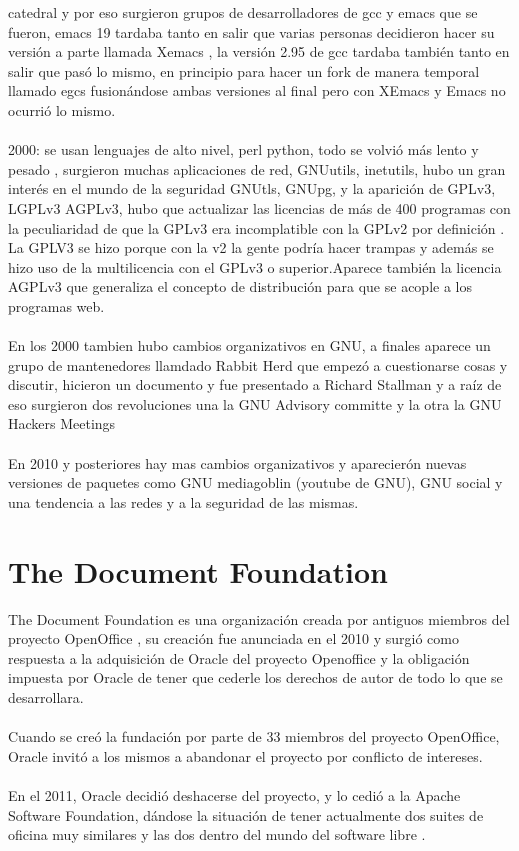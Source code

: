 \documentclass[a4paper,oneside,11pt]{article}
\begin{document}
 catedral y por eso surgieron grupos de desarrolladores de gcc y emacs que se fueron, emacs 19
  tardaba tanto en salir que varias personas decidieron hacer su versi\'on a parte llamada Xemacs , la versi\'on 2.95 de gcc 
  tardaba tambi\'en tanto en salir que pas\'o lo mismo, en principio para hacer un fork de manera temporal llamado egcs fusion\'andose
  ambas versiones al final pero con XEmacs y Emacs no ocurri\'o lo mismo.
\\\\
2000: se usan lenguajes de alto nivel, perl python, todo se volvi\'o m\'as lento y pesado , surgieron
 muchas aplicaciones de red, GNUutils, inetutils, hubo un gran inter\'es en el mundo de la seguridad
  GNUtls, GNUpg, y la aparici\'on de GPLv3, LGPLv3 AGPLv3,  hubo que actualizar las licencias de m\'as
   de 400 programas con la peculiaridad de que la GPLv3 era incomplatible con la GPLv2 por definici\'on .
    La GPLV3 se hizo porque con la v2 la gente podr\'ia hacer trampas  y adem\'as se hizo uso de la
     multilicencia con el GPLv3  o superior.Aparece tambi\'en la licencia AGPLv3 que generaliza el concepto de distribuci\'on
      para que se acople a los programas web.
\\\\
En los 2000 tambien hubo cambios organizativos en GNU, a finales aparece un grupo de mantenedores
 llamdado Rabbit Herd que empez\'o a cuestionarse cosas y discutir, hicieron un documento y fue
  presentado a Richard Stallman y a ra\'iz de eso surgieron dos revoluciones una la GNU Advisory
   committe y la otra la GNU Hackers Meetings
\\\\
En  2010 y posteriores hay mas cambios organizativos y aparecier\'on nuevas versiones de paquetes como GNU mediagoblin (youtube de GNU),
 GNU social y una tendencia a las redes y a la seguridad de las mismas.

\section{The Document Foundation}

The Document Foundation es una organizaci\'on creada por antiguos miembros del proyecto OpenOffice , su creaci\'on
fue anunciada en el 2010 y surgi\'o como respuesta a la adquisici\'on de Oracle del proyecto Openoffice y la
obligaci\'on impuesta por Oracle de tener que cederle los derechos de autor de todo lo que se desarrollara.
\\\\
Cuando se cre\'o la fundaci\'on por parte de 33 miembros del proyecto OpenOffice, Oracle invit\'o a los
mismos a abandonar el proyecto por conflicto de intereses.
\\\\
En el 2011, Oracle decidi\'o deshacerse del proyecto, y lo cedi\'o a la Apache Software Foundation, d\'andose
la situaci\'on de tener actualmente dos suites de oficina muy similares y las dos dentro del mundo
del software libre .
\end{document}
